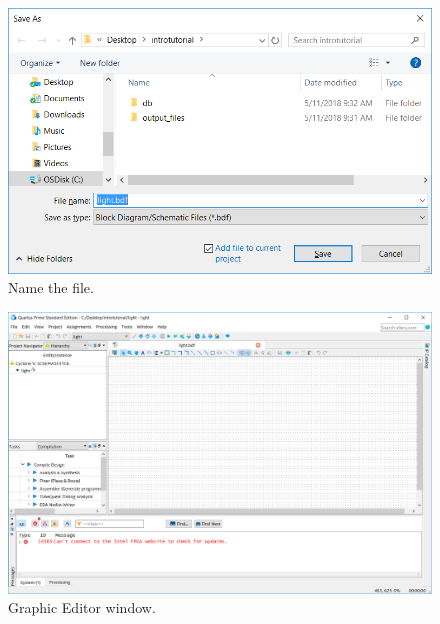 \documentclass[11pt, twoside, pdftex]{article}
\begin{document}
\begin{figure}[H]
   \begin{center}
      \includegraphics[scale=0.5]{figures/figure13.png}
   \caption{Name the file.} 
	 \label{fig:13}
	 \end{center}
\end{figure}

\begin{figure}[H]
   \begin{center}
      \includegraphics[scale=0.4]{figures/figure14.png}
   \caption{Graphic Editor window.} 
	 \label{fig:14}
	 \end{center}
\end{figure}
\end{document}

